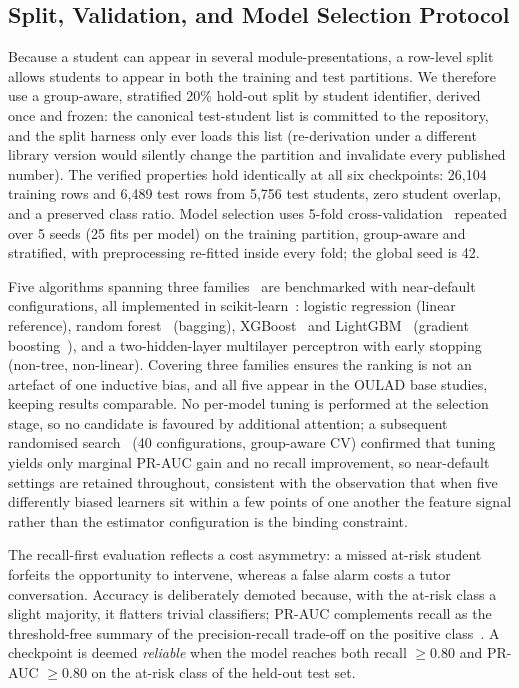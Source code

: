 \documentclass[conference]{IEEEtran}
\begin{document}
\subsection{Split, Validation, and Model Selection Protocol}

Because a student can appear in several module-presentations, a row-level
split allows students to appear in both the training and test partitions. We
therefore use a group-aware, stratified 20\% hold-out split by student
identifier, derived once and frozen: the canonical test-student list is
committed to the repository, and the split harness only ever loads this
list (re-derivation under a different library version would silently change
the partition and invalidate every published number). The verified
properties hold identically at all six checkpoints: 26,104 training rows
and 6,489 test rows from 5,756 test students, zero student overlap, and a
preserved class ratio. Model selection uses 5-fold cross-validation~\cite{kohavi1995} repeated
over 5 seeds (25 fits per model) on the training partition, group-aware and
stratified, with preprocessing re-fitted inside every fold; the global seed
is 42.

Five algorithms spanning three families~\cite{hastie2009} are benchmarked
with near-default configurations, all implemented in
scikit-learn~\cite{pedregosa2011}: logistic regression (linear reference),
random forest~\cite{breiman2001} (bagging), XGBoost~\cite{chen2016} and
LightGBM~\cite{ke2017} (gradient boosting~\cite{friedman2001}), and a
two-hidden-layer multilayer perceptron with early stopping (non-tree,
non-linear). Covering
three families ensures the ranking is not an artefact of one inductive bias,
and all five appear in the OULAD base studies, keeping results comparable.
No per-model tuning is performed at the selection stage, so no candidate is
favoured by additional attention; a subsequent randomised
search~\cite{bergstra2012} (40 configurations, group-aware CV) confirmed
that tuning yields only marginal
PR-AUC gain and no recall improvement, so near-default settings are retained
throughout, consistent with the observation that when five differently biased
learners sit within a few points of one another the feature signal rather
than the estimator configuration is the binding constraint.

The recall-first evaluation reflects a cost asymmetry: a missed at-risk
student forfeits the opportunity to intervene, whereas a false alarm costs
a tutor conversation. Accuracy is deliberately demoted because, with the
at-risk class a slight majority, it flatters trivial classifiers; PR-AUC
complements recall as the threshold-free summary of the precision-recall
trade-off on the positive class~\cite{davis2006,saito2015}. A checkpoint is deemed \emph{reliable}
when the model reaches both recall $\geq 0.80$ and PR-AUC $\geq 0.80$ on
the at-risk class of the held-out test set.
\end{document}
